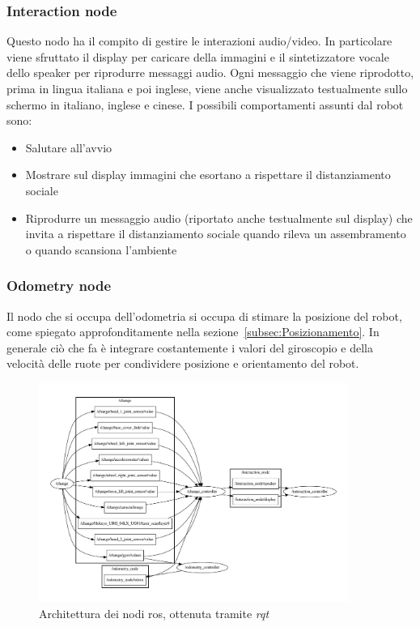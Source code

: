\documentclass[a4paper]{article}
\begin{document}
	\subsubsection{Interaction node}\label{subsubsec:Interaction-node}
	Questo nodo ha il compito di gestire le interazioni audio/video. In
	particolare viene sfruttato il display per caricare della immagini e il
	sintetizzatore vocale dello speaker per riprodurre messaggi audio. Ogni
	messaggio che viene riprodotto, prima in lingua italiana e poi inglese,
	viene anche visualizzato testualmente sullo schermo in italiano, inglese e
	cinese.  I possibili comportamenti assunti dal robot sono:
	\begin{itemize}
		\item Salutare all'avvio
		\item Mostrare sul display immagini che esortano a rispettare il
			distanziamento sociale
		\item Riprodurre un messaggio audio (riportato anche testualmente sul
			display) che invita a rispettare il distanziamento sociale quando
			rileva un assembramento o quando scansiona l'ambiente
	\end{itemize}

	\subsubsection{Odometry node}\label{subsubsec:Odometry-node}
	Il nodo che si occupa dell'odometria si occupa di stimare la posizione del
	robot, come spiegato approfonditamente nella
	sezione~\ref{subsec:Posizionamento}. In generale ciò che fa è integrare
	costantemente i valori del giroscopio e della velocità delle ruote per
	condividere posizione e orientamento del robot.
	 

	\begin{figure}[H]
		\centering
		\includegraphics[width=0.9\textwidth]{img/rosgraph.pdf}
		\caption{Architettura dei nodi ros, ottenuta tramite \textit{rqt}}
		\label{fig:rosgraph}
	\end{figure}
	
\end{document}
